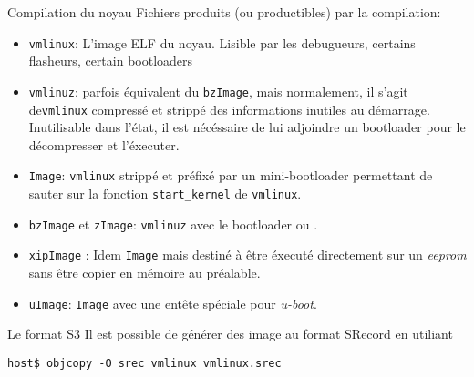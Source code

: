 \begin{frame}[fragile=singleslide]{Compilation du noyau}
  Fichiers produits (ou productibles) par la compilation:
  \begin{itemize}
  \item  \verb+vmlinux+:  L'image  ELF  du  noyau.   Lisible  par  les
    debugueurs, certains flasheurs, certain bootloaders
  \item  \verb+vmlinuz+: parfois  équivalent  du \verb+bzImage+,  mais
    normalement, il  s'agit de\verb+vmlinux+ compressé  et strippé des
    informations inutiles  au démarrage. Inutilisable  dans l'état, il
    est nécéssaire de lui adjoindre un bootloader pour le décompresser
    et l'éxecuter.
  \item  \verb+Image+:  \verb+vmlinux+   strippé  et  préfixé  par  un
    mini-bootloader   permettant    de   sauter   sur    la   fonction
    \verb+start_kernel+ de \verb+vmlinux+.
  \item  \verb+bzImage+  et   \verb+zImage+:  \verb+vmlinuz+  avec  le
    bootloader  ou .
  \item  \verb+xipImage+  :  Idem  \verb+Image+ mais  destiné  à  être
    éxecuté  directement  sur un  \emph{eeprom}  sans  être copier  en
    mémoire au préalable.
  \item  \verb+uImage+:  \verb+Image+ avec  une  entête spéciale  pour
    \emph{u-boot}.
  \end{itemize}
\end{frame}

\begin{frame}[fragile=singleslide]{Le format S3}
  Il est possible  de générer des image au  format SRecord en utiliant
  \begin{lstlisting}
host$ objcopy -O srec vmlinux vmlinux.srec
  \end{lstlisting}
\end{frame}

